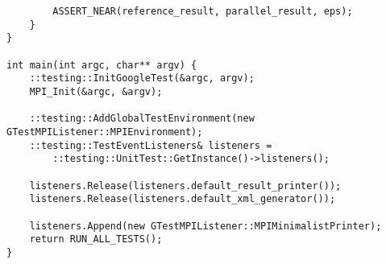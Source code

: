 \documentclass{report}
\begin{document}
\begin{lstlisting}
        ASSERT_NEAR(reference_result, parallel_result, eps);
    }
}

int main(int argc, char** argv) {
    ::testing::InitGoogleTest(&argc, argv);
    MPI_Init(&argc, &argv);

    ::testing::AddGlobalTestEnvironment(new GTestMPIListener::MPIEnvironment);
    ::testing::TestEventListeners& listeners =
        ::testing::UnitTest::GetInstance()->listeners();

    listeners.Release(listeners.default_result_printer());
    listeners.Release(listeners.default_xml_generator());

    listeners.Append(new GTestMPIListener::MPIMinimalistPrinter);
    return RUN_ALL_TESTS();
}

\end{lstlisting}
\end{document}
